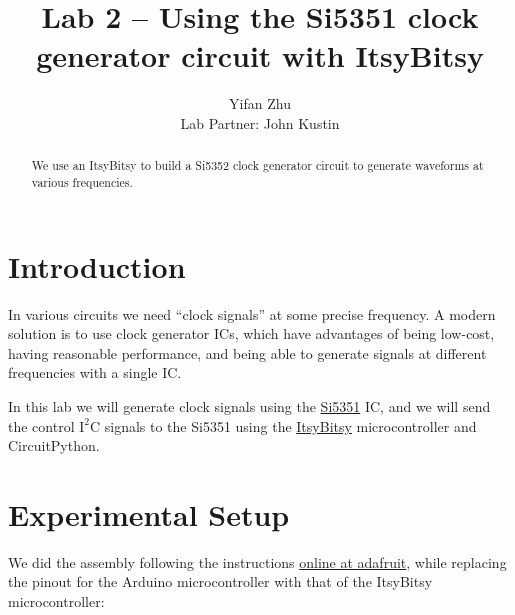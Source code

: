 \documentclass{article}
\begin{document}
\title{Lab 2 -- Using the Si5351 clock generator circuit with ItsyBitsy}
\author{
    Yifan Zhu\\
    Lab Partner: John Kustin
}
\maketitle

\begin{abstract}
    We use an ItsyBitsy to build a Si5352 clock generator circuit to generate waveforms at various frequencies.
\end{abstract}

\section{Introduction}
In various circuits we need ``clock signals'' at some precise frequency.
A modern solution is to use clock generator ICs, which have advantages of being low-cost, having reasonable performance, and being able to generate signals at different frequencies with a single IC.

In this lab we will generate clock signals using the
\href{https://cdn-shop.adafruit.com/datasheets/Si5351.pdf}{Si5351} IC,
and we will send the control $\text{I}^2\text{C}$ signals to the Si5351 using the \href{https://learn.adafruit.com/introducing-adafruit-itsybitsy-m4}{ItsyBitsy} microcontroller and CircuitPython.

\section{Experimental Setup}

We did the assembly following the instructions \href{https://learn.adafruit.com/adafruit-si5351-clock-generator-breakout/overview}{online at adafruit}, while replacing the pinout for the Arduino microcontroller with that of the ItsyBitsy microcontroller:
\end{document}
